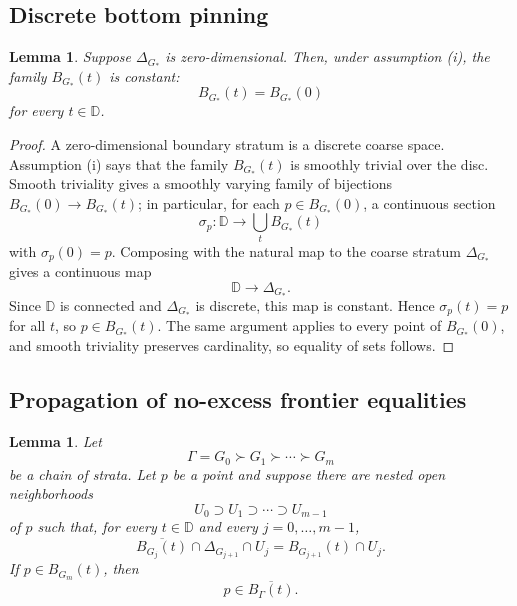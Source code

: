 \documentclass[12pt]{article}
\theoremstyle{plain}
\newtheorem{lemma}[theorem]{Lemma}
\theoremstyle{definition}
\theoremstyle{remark}
\newcommand{\D}{\mathbb D}
\begin{document}
\subsection{Discrete bottom pinning}

\begin{lemma}\label{lem:bottom-pinning}
Suppose \(\Delta_{G_*}\) is zero-dimensional.  Then, under assumption (i), the family \(B_{G_*}(t)\) is constant:
\[
B_{G_*}(t)=B_{G_*}(0)
\]
for every \(t\in\D\).
\end{lemma}

\begin{proof}
A zero-dimensional boundary stratum is a discrete coarse space.  Assumption (i) says that the family \(B_{G_*}(t)\) is smoothly trivial over the disc.  Smooth triviality gives a smoothly varying family of bijections \(B_{G_*}(0)\to B_{G_*}(t)\); in particular, for each \(p\in B_{G_*}(0)\), a continuous section
\[
\sigma_p:\D\to \bigcup_{t}B_{G_*}(t)
\]
with \(\sigma_p(0)=p\).  Composing with the natural map to the coarse stratum \(\Delta_{G_*}\) gives a continuous map
\[
\D\to \Delta_{G_*}.
\]
Since \(\D\) is connected and \(\Delta_{G_*}\) is discrete, this map is constant.  Hence \(\sigma_p(t)=p\) for all \(t\), so \(p\in B_{G_*}(t)\).  The same argument applies to every point of \(B_{G_*}(0)\), and smooth triviality preserves cardinality, so equality of sets follows.
\end{proof}

\subsection{Propagation of no-excess frontier equalities}

\begin{lemma}\label{lem:frontier-propagation}
Let
\[
\Gamma=G_0\succ G_1\succ \cdots \succ G_m
\]
be a chain of strata.  Let \(p\) be a point and suppose there are nested open neighborhoods
\[
U_0\supset U_1\supset \cdots \supset U_{m-1}
\]
of \(p\) such that, for every \(t\in\D\) and every \(j=0,\dots,m-1\),
\[
\overline{B_{G_j}(t)}\cap \Delta_{G_{j+1}}\cap U_j
=
B_{G_{j+1}}(t)\cap U_j.
\]
If \(p\in B_{G_m}(t)\), then
\[
p\in \overline{B_\Gamma(t)}.
\]
\end{lemma}
\end{document}
